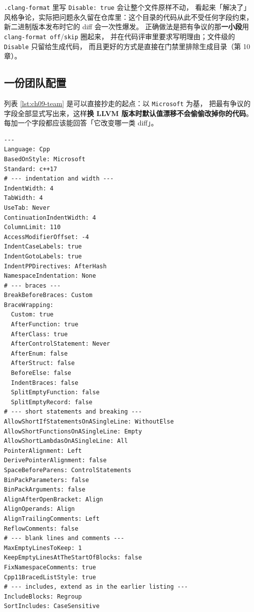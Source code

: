 \documentclass[12pt,a4paper,fontset=fandol]{ctexbook}
\newcommand{\Bk}{\discretionary{}{}{}}
\begin{document}
\begin{warning}[title={不要用文件级 \texttt{Disable: true} 掩盖配置不一致}]
  \texttt{.clang-format} 里写 \texttt{Disable: true} 会让整个文件原样不动，
  看起来「解决了」风格争论，实际把问题永久留在仓库里：这个目录的代码从此不受任何字段约束，
  新二进制版本发布时它的 diff 会一次性爆发。
  正确做法是把有争议的那\textbf{一小段}用 \texttt{clang-format off}/{\Bk}\texttt{skip} 圈起来，
  并在代码评审里要求写明理由；文件级的 \texttt{Disable} 只留给生成代码，
  而且更好的方式是直接在门禁里排除生成目录（第 10 章）。
\end{warning}

\subsection{一份团队配置}\label{sec:ch09-s6-team}

列表 \ref{lst:ch09-team} 是可以直接抄走的起点：以 \texttt{Microsoft} 为基，
把最有争议的字段全部显式写出来，这样\textbf{换 LLVM 版本时默认值漂移不会偷偷改掉你的代码}。
每加一个字段都应该能回答「它改变哪一类 diff」。

\begin{lstlisting}[style=yamlstyle,caption={仓库根 \texttt{.clang-format} 示例},label={lst:ch09-team}]
---
Language: Cpp
BasedOnStyle: Microsoft
Standard: c++17
# --- indentation and width ---
IndentWidth: 4
TabWidth: 4
UseTab: Never
ContinuationIndentWidth: 4
ColumnLimit: 110
AccessModifierOffset: -4
IndentCaseLabels: true
IndentGotoLabels: true
IndentPPDirectives: AfterHash
NamespaceIndentation: None
# --- braces ---
BreakBeforeBraces: Custom
BraceWrapping:
  Custom: true
  AfterFunction: true
  AfterClass: true
  AfterControlStatement: Never
  AfterEnum: false
  AfterStruct: false
  BeforeElse: false
  IndentBraces: false
  SplitEmptyFunction: false
  SplitEmptyRecord: false
# --- short statements and breaking ---
AllowShortIfStatementsOnASingleLine: WithoutElse
AllowShortFunctionsOnASingleLine: Empty
AllowShortLambdasOnASingleLine: All
PointerAlignment: Left
DerivePointerAlignment: false
SpaceBeforeParens: ControlStatements
BinPackParameters: false
BinPackArguments: false
AlignAfterOpenBracket: Align
AlignOperands: Align
AlignTrailingComments: Left
ReflowComments: false
# --- blank lines and comments ---
MaxEmptyLinesToKeep: 1
KeepEmptyLinesAtTheStartOfBlocks: false
FixNamespaceComments: true
Cpp11BracedListStyle: true
# --- includes, extend as in the earlier listing ---
IncludeBlocks: Regroup
SortIncludes: CaseSensitive
\end{lstlisting}
\end{document}

